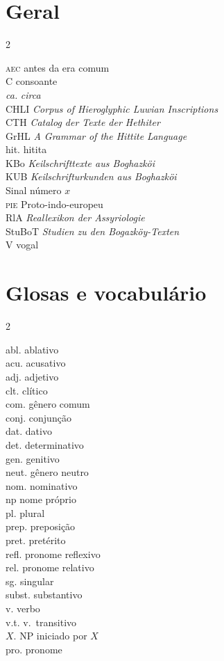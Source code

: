 \newcommand{\abreviacao}[2]{\noindent #1 \hspace{10pt}\hfill #2\\}
\newenvironment{abreviacoes}{
	\flushright%
	\setlength{\columnsep}{50pt}
	\small
	\begin{multicols}{2}
		}{
	\end{multicols}
}

\section*{Geral}
\begin{abreviacoes}
	\abreviacao{\textsc{aec}}{antes da era comum}
	\abreviacao{C}{consoante}
	\abreviacao{\emph{ca.}}{\emph{circa}}
	\abreviacao{CHLI}{\emph{\foreignlanguage{english}{Corpus of Hieroglyphic Luwian Inscriptions}}}
	\abreviacao{CTH}{\emph{\foreignlanguage{german}{Catalog der Texte der Hethiter}}}
	\abreviacao{GrHL}{\emph{\foreignlanguage{english}{A Grammar of the Hittite Language}}}
	\abreviacao{hit.}{hitita}
	\abreviacao{KBo}{\emph{\foreignlanguage{german}{Keilschrifttexte aus Boghazköi}}}
	\abreviacao{KUB}{\emph{\foreignlanguage{german}{Keilschrifturkunden aus Boghazköi}}}
	\abreviacao{}{Sinal número $x$}
	\abreviacao{\textsc{pie}}{Proto-indo-europeu}
	\abreviacao{RlA}{\emph{\foreignlanguage{german}{Reallexikon der Assyriologie}}}
	\abreviacao{StuBoT}{\emph{\foreignlanguage{german}{Studien zu den
				Bogazköy-Texten}}}
	\abreviacao{V}{vogal}
\end{abreviacoes}


\section*{Glosas e vocabulário}
\begin{abreviacoes}
	\abreviacao{abl.}{ablativo}
	\abreviacao{acu.}{acusativo}
	\abreviacao{adj.}{adjetivo}
	\abreviacao{clt.}{clítico}
	\abreviacao{com.}{gênero comum}
	\abreviacao{conj.}{conjunção}
	\abreviacao{dat.}{dativo}
	\abreviacao{det.}{determinativo}
	\abreviacao{gen.}{genitivo}
	\abreviacao{neut.}{gênero neutro}
	\abreviacao{nom.}{nominativo}
	\abreviacao{np}{nome próprio}
	\abreviacao{pl.}{plural}
	\abreviacao{prep.}{preposição}
	\abreviacao{pret.}{pretérito}
	\abreviacao{refl.}{pronome reflexivo}
	\abreviacao{rel.}{pronome relativo}
	\abreviacao{sg.}{singular}
	\abreviacao{subst.}{substantivo}
	\abreviacao{v.}{verbo}
	\abreviacao{v.t.}{v.\ transitivo}
	\abreviacao{$X$.}{NP iniciado por $X$}
	\abreviacao{pro.}{pronome}
\end{abreviacoes}
